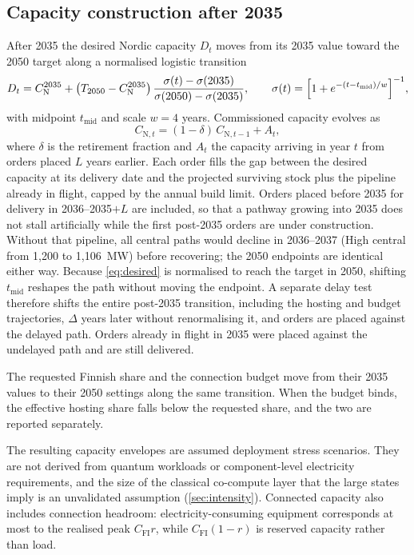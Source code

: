 \documentclass[11pt,a4paper]{article}
\newcommand{\Cfi}{C_{\mathrm{FI}}}
\newcommand{\CN}{C_{\mathrm{N}}}
\begin{document}
\subsection{Capacity construction after 2035}
After 2035 the desired Nordic capacity $D_t$ moves from its 2035 value toward the 2050 target along a normalised logistic transition
\begin{equation}\label{eq:desired}
D_t = \CN^{2035} + \bigl(T_{2050}-\CN^{2035}\bigr)\, \frac{\sigma(t)-\sigma(2035)}{\sigma(2050)-\sigma(2035)},\qquad \sigma(t)=\Bigl[1+e^{-(t-t_{\mathrm{mid}})/w}\Bigr]^{-1},
\end{equation}
with midpoint $t_{\mathrm{mid}}$ and scale $w=4$ years. Commissioned capacity evolves as
\begin{equation}\label{eq:stock}
C_{\mathrm{N},t} = (1-\delta)\,C_{\mathrm{N},t-1} + A_t ,
\end{equation}
where $\delta$ is the retirement fraction and $A_t$ the capacity arriving in year $t$ from orders placed $L$ years earlier. Each order fills the gap between the desired capacity at its delivery date and the projected surviving stock plus the pipeline already in flight, capped by the annual build limit. Orders placed before 2035 for delivery in 2036--2035$+L$ are included, so that a pathway growing into 2035 does not stall artificially while the first post-2035 orders are under construction. Without that pipeline, all central paths would decline in 2036--2037 (High central from 1,200 to 1,106~MW) before recovering; the 2050 endpoints are identical either way. Because \cref{eq:desired} is normalised to reach the target in 2050, shifting $t_{\mathrm{mid}}$ reshapes the path without moving the endpoint. A separate delay test therefore shifts the entire post-2035 transition, including the hosting and budget trajectories, $\Delta$ years later without renormalising it, and orders are placed against the delayed path. Orders already in flight in 2035 were placed against the undelayed path and are still delivered.

The requested Finnish share and the connection budget move from their 2035 values to their 2050 settings along the same transition. When the budget binds, the effective hosting share falls below the requested share, and the two are reported separately.

The resulting capacity envelopes are assumed deployment stress scenarios. They are not derived from quantum workloads or component-level electricity requirements, and the size of the classical co-compute layer that the large states imply is an unvalidated assumption (\cref{sec:intensity}). Connected capacity also includes connection headroom: electricity-consuming equipment corresponds at most to the realised peak $\Cfi r$, while $\Cfi(1-r)$ is reserved capacity rather than load.
\end{document}
